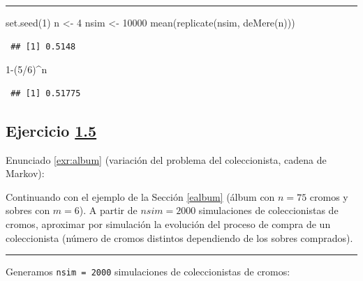 \documentclass[
  10pt,
]{book}
\newenvironment{Shaded}{\begin{snugshade}}{\end{snugshade}}
\newcommand{\DecValTok}[1]{\textcolor[rgb]{0.00,0.00,0.81}{#1}}
\newcommand{\FunctionTok}[1]{\textcolor[rgb]{0.00,0.00,0.00}{#1}}
\newcommand{\NormalTok}[1]{#1}
\newcommand{\OtherTok}[1]{\textcolor[rgb]{0.56,0.35,0.01}{#1}}
\newcommand{\SpecialCharTok}[1]{\textcolor[rgb]{0.00,0.00,0.00}{#1}}
\theoremstyle{break}
\theoremstyle{nonumberplain}
\begin{document}
\begin{center}\rule{0.5\linewidth}{0.5pt}\end{center}

\begin{Shaded}
\begin{Highlighting}[]
\FunctionTok{set.seed}\NormalTok{(}\DecValTok{1}\NormalTok{)}
\NormalTok{n }\OtherTok{\textless{}{-}} \DecValTok{4}
\NormalTok{nsim }\OtherTok{\textless{}{-}} \DecValTok{10000}
\FunctionTok{mean}\NormalTok{(}\FunctionTok{replicate}\NormalTok{(nsim, }\FunctionTok{deMere}\NormalTok{(n)))}
\end{Highlighting}
\end{Shaded}

\begin{verbatim}
 ## [1] 0.5148
\end{verbatim}

\begin{Shaded}
\begin{Highlighting}[]
\DecValTok{1}\SpecialCharTok{{-}}\NormalTok{(}\DecValTok{5}\SpecialCharTok{/}\DecValTok{6}\NormalTok{)}\SpecialCharTok{\^{}}\NormalTok{n}
\end{Highlighting}
\end{Shaded}

\begin{verbatim}
 ## [1] 0.51775
\end{verbatim}

\hypertarget{sol-album}{%
\subsection{\texorpdfstring{Ejercicio \href{ejercicios.html\#exr:album}{1.5}}{Ejercicio 1.5}}\label{sol-album}}

Enunciado \ref{exr:album} (variación del problema del coleccionista, cadena de Markov):

Continuando con el ejemplo de la Sección \ref{ealbum}
(álbum con \(n = 75\) cromos y sobres con \(m = 6\)). A partir de \(nsim=2000\) simulaciones de coleccionistas de cromos, aproximar por simulación la evolución del proceso de compra de un coleccionista (número de cromos distintos dependiendo de los sobres comprados).

\begin{center}\rule{0.5\linewidth}{0.5pt}\end{center}

Generamos \texttt{nsim\ =\ 2000} simulaciones de coleccionistas de cromos:
\end{document}
